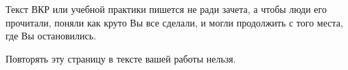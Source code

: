 \documentclass[14pt, russian]{matmex-diploma-custom}
\begin{document}

\maketitle
\setcounter{tocdepth}{2}
\tableofcontents


\pagebreak
\begin{center}
  {\Huge
    Текст ВКР или учебной практики пишется не ради зачета, а чтобы люди его прочитали, поняли как круто Вы все сделали, и могли продолжить с того места, где Вы остановились.}

  \vspace{2em}
  Повторять эту страницу в тексте вашей работы нельзя.
\end{center}
\pagebreak












\setmonofont{CMU Typewriter Text}


\end{document}

